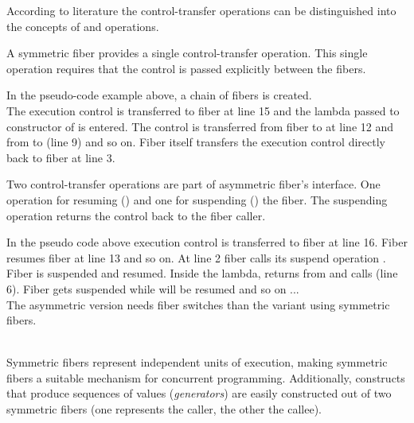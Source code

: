 
According to literature\cite{Moura2009} the control-transfer operations can be
distinguished into the concepts of \sym and \asym operations.

 A symmetric fiber provides a single
control-transfer operation. This single operation requires that the control is
passed explicitly between the fibers.\\


In the pseudo-code example above, a chain of fibers is created.\\
The execution control is transferred to fiber  at line 15 and the lambda
passed to constructor of  is entered. The control is transferred from
fiber  to  at line 12 and from  to  (line 9) and
so on. Fiber  itself transfers the execution control directly back to
fiber  at line 3.

 Two control-transfer operations are part of
asymmetric fiber's interface. One operation for resuming (\resume) and one for
suspending () the fiber. The suspending operation returns the
control back to the fiber caller.\\

In the pseudo code above execution control is transferred to fiber  at
line 16. Fiber  resumes fiber  at line 13 and so on. At line 2
fiber  calls its suspend operation . Fiber 
is suspended and  resumed. Inside the lambda,  returns from
 and calls  (line 6). Fiber  gets
suspended while  will be resumed and so on ...\\
The asymmetric version needs  fiber switches than the variant
using symmetric fibers.\\

\\
\newline

Symmetric fibers represent independent units of execution, making symmetric
fibers a suitable mechanism for concurrent programming. Additionally,
constructs that produce sequences of values (\emph{generators}) are easily
constructed out of two symmetric fibers (one represents the caller, the other
the callee).\\

